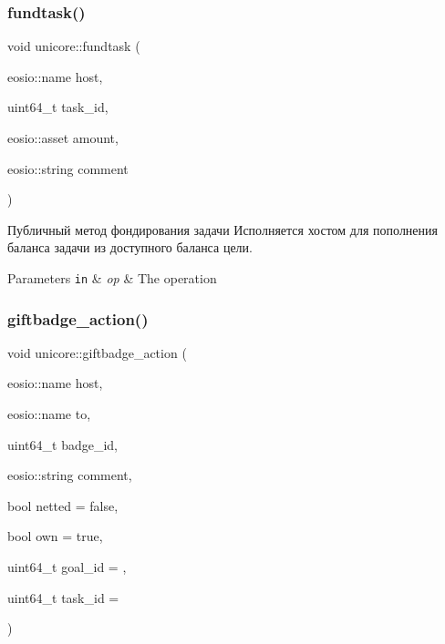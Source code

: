 \subsubsection{\texorpdfstring{fundtask()}{fundtask()}}
{\footnotesize\ttfamily void unicore\+::fundtask (\begin{DoxyParamCaption}\item[{eosio\+::name}]{host,  }\item[{uint64\+\_\+t}]{task\+\_\+id,  }\item[{eosio\+::asset}]{amount,  }\item[{eosio\+::string}]{comment }\end{DoxyParamCaption})}



Публичный метод фондирования задачи Исполняется хостом для пополнения баланса задачи из доступного баланса цели. 


\begin{DoxyParams}[1]{Parameters}
\mbox{\tt in}  & {\em op} & The operation \\
\hline
\end{DoxyParams}
\mbox{\label{classunicore_a8cdb743e8708845d4a6064d43400d415}} 
\subsubsection{\texorpdfstring{giftbadge\+\_\+action()}{giftbadge\_action()}}
{\footnotesize\ttfamily void unicore\+::giftbadge\+\_\+action (\begin{DoxyParamCaption}\item[{eosio\+::name}]{host,  }\item[{eosio\+::name}]{to,  }\item[{uint64\+\_\+t}]{badge\+\_\+id,  }\item[{eosio\+::string}]{comment,  }\item[{bool}]{netted = {\ttfamily false},  }\item[{bool}]{own = {\ttfamily true},  }\item[{uint64\+\_\+t}]{goal\+\_\+id = {},  }\item[{uint64\+\_\+t}]{task\+\_\+id = {} }\end{DoxyParamCaption})\hspace{0.3cm}{\ttfamily [static]}}



